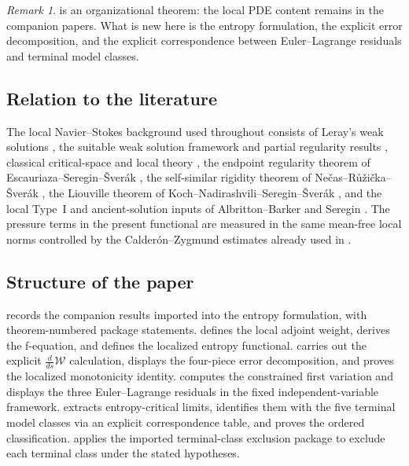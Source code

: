\documentclass[11pt]{amsart}
\numberwithin{equation}{section}
\theoremstyle{plain}
\theoremstyle{definition}
\theoremstyle{remark}
\newtheorem{remark}[theorem]{Remark}
\newcommand{\Wloc}{\mathcal W}
\begin{document}
\begin{remark}
 is an organizational theorem: the local PDE content
remains in the companion papers.  What is new here is the entropy
formulation, the explicit error decomposition, and the explicit
correspondence between Euler--Lagrange residuals and terminal model classes.
\end{remark}

\subsection*{Relation to the literature}

The local Navier--Stokes background used throughout consists of Leray's weak
solutions \cite{Leray1934}, the suitable weak solution framework and partial
regularity results \cite{Scheffer1976,CKN1982,Lin1998}, classical
critical-space and local theory
\cite{Ladyzhenskaya1969,Temam1977,ConstantinFoias1988,Kato1984,LemarieRieusset2002},
the endpoint regularity theorem of Escauriaza--Seregin--\v Sver\'ak
\cite{ESS2003}, the self-similar rigidity theorem of
Ne\v cas--R\r u\v zi\v cka--\v Sver\'ak \cite{NRS1996}, the Liouville theorem
of Koch--Nadirashvili--Seregin--\v Sver\'ak \cite{KNSS2009}, and the local
Type~I and ancient-solution inputs of Albritton--Barker and Seregin
\cite{AlbrittonBarker2019,Seregin2012}.  The pressure terms in the present
functional are measured in the same mean-free local norms controlled by the
Calder\'on--Zygmund estimates \cite{CalderonZygmund1952,Stein1970} already
used in \cite{BallesterTypeII}.

\subsection*{Structure of the paper}

 records the companion results imported into the
entropy formulation, with theorem-numbered package statements.  
defines the local adjoint weight, derives the f-equation, and defines the
localized entropy functional.   carries out the
explicit \(\frac{d}{ds}\Wloc\) calculation, displays the four-piece error
decomposition, and proves the localized monotonicity identity.
 computes the constrained first variation and displays
the three Euler--Lagrange residuals in the fixed independent-variable
framework.
 extracts entropy-critical limits, identifies them with
the five terminal model classes via an explicit correspondence table, and
proves the ordered classification.   applies the imported
terminal-class exclusion package to exclude each terminal class under the
stated hypotheses.
\end{document}
